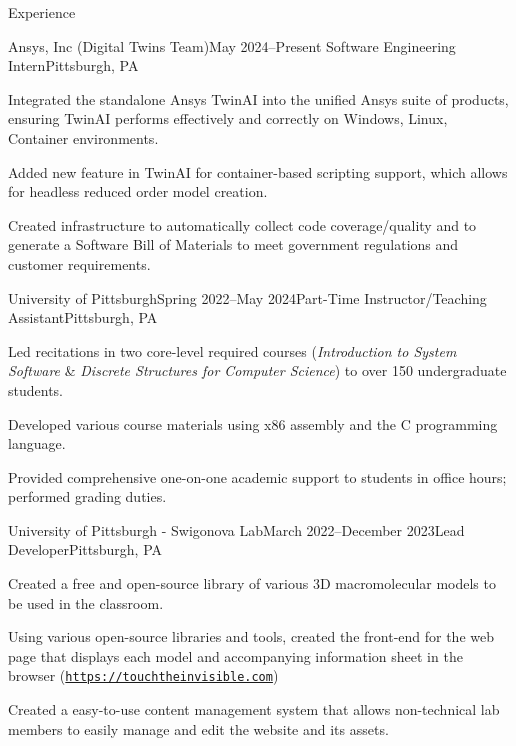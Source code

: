 \begin{rSection}{Experience}
    \begin{rSubsection}{Ansys, Inc (Digital Twins Team)}{May 2024–Present}
    {Software Engineering Intern}{Pittsburgh, PA}
        \item Integrated the standalone Ansys TwinAI into the unified Ansys suite of products, ensuring TwinAI performs effectively and correctly on  Windows, Linux, Container environments. 
         \item Added new feature in TwinAI for container-based scripting support, which allows for headless reduced order model creation.
        \item Created infrastructure to automatically collect code coverage/quality and to generate a Software Bill of Materials to meet government regulations and customer requirements.
    \end{rSubsection}
  
    \begin{rSubsection}{University of Pittsburgh}{Spring 2022–May 2024}{Part-Time Instructor/Teaching Assistant}{Pittsburgh, PA}
        \item Led recitations in two core-level required courses (\textit{Introduction to System Software} \& \textit{Discrete Structures for Computer Science}) to over 150 undergraduate students.
        \item Developed various course materials using x86 assembly and the C programming language.
        \item Provided comprehensive one-on-one academic support to students in office hours; performed grading duties.
    \end{rSubsection}

    \begin{rSubsection}{University of Pittsburgh - Swigonova Lab}{March 2022–December 2023}{Lead Developer}{Pittsburgh, PA}
        \item Created a free and open-source library of various 3D macromolecular models to be used in the classroom.
        \item Using various open-source libraries and tools, created the front-end for the web page that displays each model and accompanying information sheet in the browser (\href{https://touchtheinvisible.com}{\nolinkurl{https://touchtheinvisible.com}})
        \item Created a easy-to-use content management system that allows non-technical lab members to easily manage and edit the website and its assets.
    \end{rSubsection}
    
  
  \end{rSection}